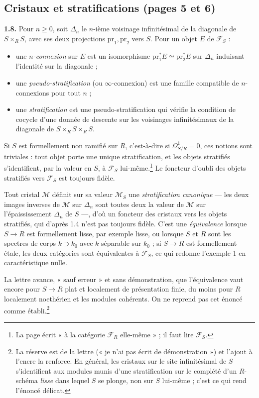 \documentclass[11pt,a4paper]{article}
\begin{document}
\subsection*{Cristaux et stratifications (pages 5 et 6)}

\textbf{1.8.} Pour $n \geq 0$, soit $\Delta_n$ le $n$-ième voisinage
infinitésimal de la diagonale de $S \times_R S$, avec ses deux projections
$\mathrm{pr}_1, \mathrm{pr}_2$ vers $S$. Pour un objet $E$ de
$\mathcal{F}_S$ :
\begin{itemize}
\item une \emph{$n$-connexion} sur $E$ est un isomorphisme
$\mathrm{pr}_1^*E \simeq \mathrm{pr}_2^*E$ sur $\Delta_n$ induisant l'identité
sur la diagonale ;
\item une \emph{pseudo-stratification} (ou $\infty$-connexion) est une famille
compatible de $n$-connexions pour tout $n$ ;
\item une \emph{stratification} est une pseudo-stratification qui vérifie la
condition de cocycle d'une donnée de descente sur les voisinages
infinitésimaux de la diagonale de $S \times_R S \times_R S$.
\end{itemize}
Si $S$ est formellement non ramifié sur $R$, c'est-à-dire si
$\Omega^1_{S/R} = 0$, ces notions sont triviales : tout objet porte une unique
stratification, et les objets stratifiés s'identifient, par la valeur en $S$, à
$\mathcal{F}_S$ lui-même.\footnote{La page écrit « à la catégorie
$\mathcal{F}_R$ elle-même » ; il faut lire $\mathcal{F}_S$.} Le foncteur
d'oubli des objets stratifiés vers $\mathcal{F}_S$ est toujours fidèle.

Tout cristal $\mathcal{M}$ définit sur sa valeur $\mathcal{M}_S$ une
\emph{stratification canonique} — les deux images inverses de $\mathcal{M}$ sur
$\Delta_n$ sont toutes deux la valeur de $\mathcal{M}$ sur l'épaississement
$\Delta_n$ de $S$ —, d'où un foncteur des cristaux vers les objets stratifiés,
qui d'après 1.4 n'est pas toujours fidèle. C'est une \emph{équivalence} lorsque
$S \to R$ est formellement lisse, par exemple lisse, ou lorsque $S$ et $R$ sont
les spectres de corps $k \supset k_0$ avec $k$ séparable sur $k_0$ ; si $S \to R$
est formellement étale, les deux catégories sont équivalentes à
$\mathcal{F}_S$, ce qui redonne l'exemple 1 en caractéristique nulle.

La lettre avance, « sauf erreur » et sans démonstration, que l'équivalence vaut
encore pour $S \to R$ plat et localement de présentation finie, du moins pour
$R$ localement noethérien et les modules cohérents. On ne reprend pas cet
énoncé comme établi.\footnote{La réserve est de la lettre (« je n'ai pas écrit
de démonstration ») et l'ajout à l'encre la renforce. En général, les
cristaux sur le site infinitésimal de $S$ s'identifient aux modules munis
d'une stratification sur le complété d'un $R$-schéma \emph{lisse} dans lequel
$S$ se plonge, non sur $S$ lui-même ; c'est ce qui rend l'énoncé délicat.}
\end{document}
